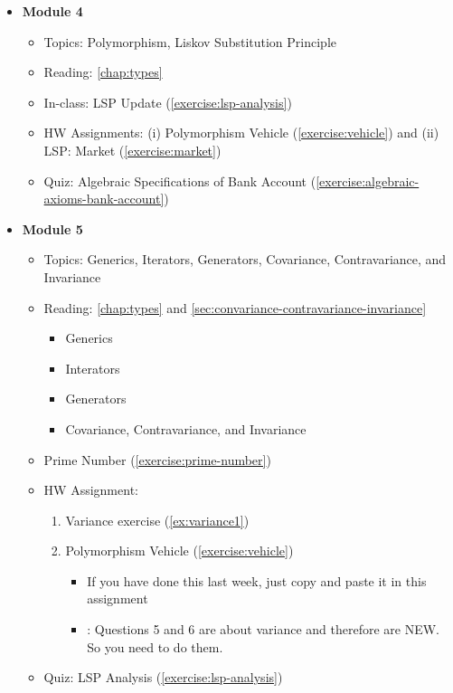 \documentclass[oneside,11pt,dvipsnames]{book}
\newcommand{\red}[1]{{\color{red}{#1}}}
\begin{document}
\begin{itemize}
    \item \textbf{Module 4}
    \begin{itemize}
        \item Topics: Polymorphism, Liskov Substitution Principle
        \item Reading: \autoref{chap:types}
        \item In-class: LSP Update (\autoref{exercise:lsp-analysis})
        \item HW Assignments: (i) Polymorphism Vehicle (\autoref{exercise:vehicle}) and (ii) LSP: Market (\autoref{exercise:market}) 
        \item Quiz: Algebraic Specifications of Bank Account (\autoref{exercise:algebraic-axioms-bank-account}) 
    \end{itemize}

    \item \textbf{Module 5}
    \begin{itemize}
        \item Topics: Generics, Iterators, Generators, Covariance, Contravariance, and Invariance
        \item Reading: \autoref{chap:types} and \autoref{sec:convariance-contravariance-invariance}
        \begin{itemize}
            \item Generics
            \item Interators
            \item Generators
            \item Covariance, Contravariance, and Invariance
        \end{itemize}
        \item Prime Number (\autoref{exercise:prime-number})
        \item HW Assignment: \red{\textbf{Due date: Wed 3/26}}
        \begin{enumerate}
            \item Variance exercise (\autoref{ex:variance1})
        \item Polymorphism Vehicle (\autoref{exercise:vehicle})
        \begin{itemize}
        \item If you have done this last week, just copy and paste it in this assignment
        \item \red{Important}: Questions 5 and 6 are about variance and therefore are NEW. So you need to do them.
        \end{itemize} 
        \end{enumerate}            
        \item Quiz: LSP Analysis (\autoref{exercise:lsp-analysis})
    \end{itemize}


\end{itemize}
\end{document}
